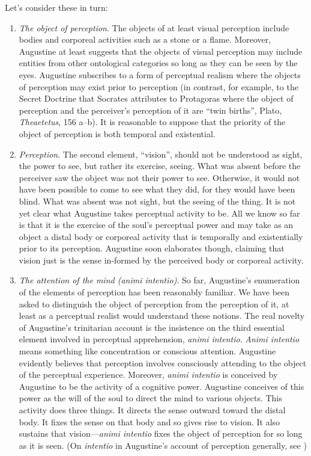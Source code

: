 \documentclass[12pt]{article}
\begin{document}
Let's consider these in turn:
\begin{enumerate}[(1)]
	\item \emph{The object of perception}. The objects of at least visual perception include bodies and corporeal activities such as a stone or a flame. Moreover, Augustine at least suggests that the objects of visual perception may include entities from other ontological categories so long as they can be seen by the eyes. Augustine subscribes to a form of perceptual realism where the objects of perception may exist prior to perception (in contrast, for example, to the Secret Doctrine that Socrates attributes to Protagoras where the object of perception and the perceiver's perception of it are ``twin births'', Plato, \emph{Theaetetus}, 156 a--b). It is reasonable to suppose that the priority of the object of perception is both temporal and existential.
	\item \emph{Perception}. The second element, ``vision'', should not be understood as sight, the power to see, but rather its exercise, seeing. What was absent before the perceiver saw the object was not their power to see. Otherwise, it would not have been possible to come to see what they did, for they would have been blind. What was absent was not sight, but the seeing of the thing. It is not yet clear what Augustine takes perceptual activity to be. All we know so far is that it is the exercise of the soul's perceptual power and may take as an object a distal body or corporeal activity that is temporally and existentially prior to its perception. Augustine soon elaborates though, claiming that vision just is the sense in-formed by the perceived body or corporeal activity.
	\item \emph{The attention of the mind (\emph{animi intentio})}. So far, Augustine's enumeration of the elements of perception has been reasonably familiar. We have been asked to distinguish the object of perception from the perception of it, at least as a perceptual realist would understand these notions. The real novelty of Augustine's trinitarian account is the insistence on the third essential element involved in perceptual apprehension, \emph{animi intentio}. \emph{Animi intentio} means something like concentration or conscious attention. Augustine evidently believes that perception involves consciously attending to the object of the perceptual experience. Moreover, \emph{animi intentio} is conceived by Augustine to be the activity of a cognitive power. Augustine conceives of this power as the will of the soul to direct the mind to various objects. This activity does three things. It directs the sense outward toward the distal body. It fixes the sense on that body and so gives rise to vision. It also sustains that vision---\emph{animi intentio} fixes the object of perception for so long as it is seen. (On \emph{intentio} in Augustine's account of perception generally, see \citealt[chapter 3.2]{ODaly:1987fq})
\end{enumerate}
\end{document}
